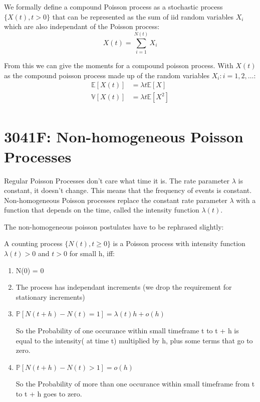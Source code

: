 \documentclass[12pt]{article}
\begin{document}
    We formally define a compound Poisson process as a stochastic 
    process \(\{X(t), t > 0\}\) that can be represented as the sum of iid random variables \(X_i\) which are also independant of the Poisson process:
    \begin{equation*}
        X(t) = \sum_{i = 1}^{N(t)} X_i
    \end{equation*}

    From this we can give the moments for a compound poisson process. With \(X(t)\) as the 
    compound poisson process made up of the random variables \(X_i: i=1, 2, \dots\):
    \begin{equation*}
        \begin{aligned}
            \mathbb{E}[X(t)] &= \lambda t \mathbb{E}[X]   \\
            \mathbb{V}[X(t)] &= \lambda t \mathbb{E}[X^2] \\
        \end{aligned}
    \end{equation*}
\section{3041F: Non-homogeneous Poisson Processes}
    Regular Poisson Processes don't care what time it is. 
    The rate parameter \(\lambda\) is constant, it doesn't change. This means that the frequency of events is constant.
    Non-homogeneous Poisson processes replace the constant rate parameter \(\lambda\) with a function that depends on the time, called the intensity function \(\lambda(t)\).

    The non-homogeneous poisson postulates have to be rephrased slightly:

    A counting process \(\{N(t), t \ge 0\}\) is a Poisson process with intensity function
    \( \lambda(t) > 0 \) and \(t > 0 \) for small h, iff:
    \begin{enumerate}
        \item N(0) = 0
        \item The process has independant increments (we drop the requirement for stationary increments)
        \item \(\mathbb{P}[N(t + h) - N(t) = 1] = \lambda(t) h + o(h)\)

            So the Probability of one occurance within small timeframe t to t + h is equal to the intensity( at time t) multiplied by h, plus some terms that go to zero.
        \item \(\mathbb{P}[N(t + h) - N(t) > 1] = o(h)\)

            So the Probability of more than one occurance within small timeframe from t to t + h goes to zero.
    \end{enumerate}
\end{document}

